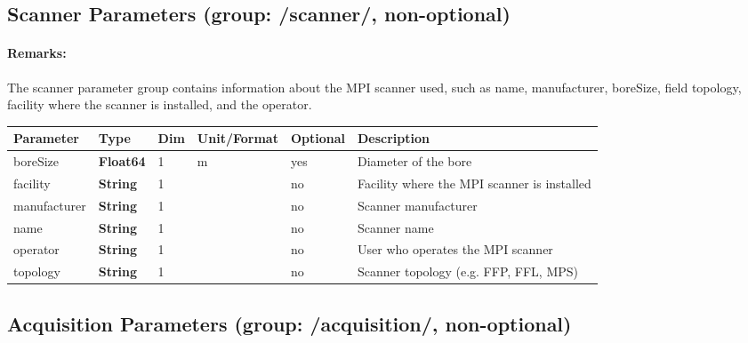 \documentclass[landscape,a4paper]{article} %
\newcommand{\inltab}[1]{{\ttfamily\bfseries\color{blue}#1}}
\newcommand{\inlvar}[1]{{\ttfamily#1}}
\begin{document}
\newpage
\subsection{Scanner Parameters (group: \inlvar{/scanner/}, non-optional)}

\begin{multicols}{2}
\paragraph{Remarks:} The scanner parameter group contains information about the MPI scanner used, such as \inlvar{name}, \inlvar{manufacturer}, \inlvar{boreSize}, field \inlvar{topology}, \inlvar{facility} where the scanner is installed, and the \inlvar{operator}.
\end{multicols}

\setlength\extrarowheight{5pt}
\noindent \begin{tabularx}{\columnwidth}{lllllX}
\noindent \textbf{Parameter} & \textbf{Type} & \textbf{Dim} & \textbf{Unit/Format} & \textbf{Optional} & \textbf{Description} \\ \hline 
\inlvar{boreSize} & \inltab{Float64} & 1 & m & yes & Diameter of the bore \\ \hline 
\inlvar{facility} & \inltab{String} & 1 & & no & Facility where the MPI scanner is installed \\ \hline 
\inlvar{manufacturer} & \inltab{String} & 1 & & no & Scanner manufacturer \\ \hline 
\inlvar{name} & \inltab{String} & 1 & & no & Scanner name \\ \hline 
\inlvar{operator} & \inltab{String} & 1 & & no & User who operates the MPI scanner \\ \hline 
\inlvar{topology} & \inltab{String} & 1 & & no & Scanner topology (e.g. FFP, FFL, MPS)\\ \hline 
\end{tabularx}
\setlength\extrarowheight{0pt}

\newpage
\subsection{Acquisition Parameters (group: \inlvar{/acquisition/}, non-optional)}
\end{document}
